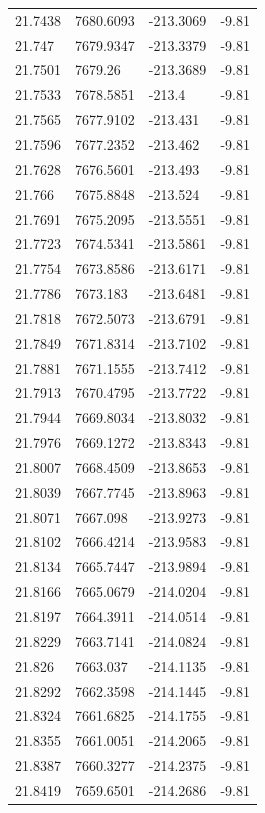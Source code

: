 \begin{table}[H]
\begin{tabular}{llll}
21.7438 & 7680.6093 & -213.3069 & -9.81 \\
21.747 & 7679.9347 & -213.3379 & -9.81 \\
21.7501 & 7679.26 & -213.3689 & -9.81 \\
21.7533 & 7678.5851 & -213.4 & -9.81 \\
21.7565 & 7677.9102 & -213.431 & -9.81 \\
21.7596 & 7677.2352 & -213.462 & -9.81 \\
21.7628 & 7676.5601 & -213.493 & -9.81 \\
21.766 & 7675.8848 & -213.524 & -9.81 \\
21.7691 & 7675.2095 & -213.5551 & -9.81 \\
21.7723 & 7674.5341 & -213.5861 & -9.81 \\
21.7754 & 7673.8586 & -213.6171 & -9.81 \\
21.7786 & 7673.183 & -213.6481 & -9.81 \\
21.7818 & 7672.5073 & -213.6791 & -9.81 \\
21.7849 & 7671.8314 & -213.7102 & -9.81 \\
21.7881 & 7671.1555 & -213.7412 & -9.81 \\
21.7913 & 7670.4795 & -213.7722 & -9.81 \\
21.7944 & 7669.8034 & -213.8032 & -9.81 \\
21.7976 & 7669.1272 & -213.8343 & -9.81 \\
21.8007 & 7668.4509 & -213.8653 & -9.81 \\
21.8039 & 7667.7745 & -213.8963 & -9.81 \\
21.8071 & 7667.098 & -213.9273 & -9.81 \\
21.8102 & 7666.4214 & -213.9583 & -9.81 \\
21.8134 & 7665.7447 & -213.9894 & -9.81 \\
21.8166 & 7665.0679 & -214.0204 & -9.81 \\
21.8197 & 7664.3911 & -214.0514 & -9.81 \\
21.8229 & 7663.7141 & -214.0824 & -9.81 \\
21.826 & 7663.037 & -214.1135 & -9.81 \\
21.8292 & 7662.3598 & -214.1445 & -9.81 \\
21.8324 & 7661.6825 & -214.1755 & -9.81 \\
21.8355 & 7661.0051 & -214.2065 & -9.81 \\
21.8387 & 7660.3277 & -214.2375 & -9.81 \\
21.8419 & 7659.6501 & -214.2686 & -9.81 \\

\end{tabular}
\end{table}
